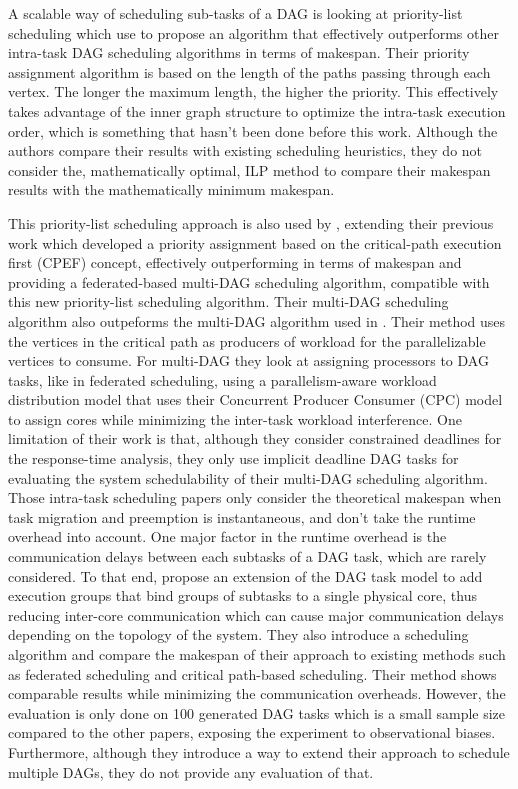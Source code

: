 A scalable way of scheduling sub-tasks of a DAG 
is looking at priority-list scheduling
which \citet{He2019DagIntra} use to propose 
an algorithm that effectively outperforms
other intra-task DAG scheduling algorithms
in terms of makespan.
Their priority assignment algorithm
is based on the length of the paths passing through each vertex.
The longer the maximum length, the higher the priority.
This effectively takes advantage of the inner graph structure
to optimize the intra-task execution order,
which is something that hasn't been done before this work.
Although the authors compare their results with existing
scheduling heuristics, they do not consider 
the, mathematically optimal, ILP method to compare
their makespan results with the mathematically minimum makespan.

This priority-list scheduling approach is also 
used by \citet{Zhao2022DAGsched}, extending their previous work\cite{zhao2020DAGsched}
which developed a priority assignment based on 
the critical-path execution first (CPEF) concept,
effectively outperforming \citet{He2019DagIntra}
in terms of makespan and providing 
a federated-based multi-DAG scheduling algorithm,
compatible with this new priority-list scheduling algorithm.
Their multi-DAG scheduling algorithm also outpeforms 
the multi-DAG algorithm used in \cite{He2019DagIntra}.
Their method uses the vertices in the critical path 
as producers of workload for the parallelizable vertices
to consume.
For multi-DAG they look at assigning processors
to DAG tasks, like in federated scheduling, using 
a parallelism-aware workload distribution model
that uses their Concurrent Producer Consumer (CPC) model
to assign cores while minimizing the inter-task workload interference.
One limitation of their work is that,
although they consider constrained deadlines for the response-time
analysis, they only use implicit deadline DAG tasks 
for evaluating the system schedulability of their multi-DAG 
scheduling algorithm.\\


Those intra-task scheduling papers only consider the theoretical
makespan when task migration and preemption 
is instantaneous, and don't take the runtime overhead into account.
One major factor in the runtime overhead is the communication 
delays between each subtasks of a DAG task, which are rarely considered.
To that end, \citet{Shi2024DagExecGroups}
propose an extension of the DAG task model to add 
execution groups that bind groups of subtasks
to a single physical core, thus reducing 
inter-core communication which can cause major
communication delays depending on the topology of the system.
They also introduce a scheduling algorithm 
and compare the makespan of their approach to existing methods
such as federated scheduling and critical path-based scheduling.
Their method shows comparable results while minimizing 
the communication overheads.
However, the evaluation is only done on 100 generated 
DAG tasks which is a small sample size compared to the other papers\cite{Zhao2022DAGsched}\cite{He2019DagIntra},
exposing the experiment to observational biases.
Furthermore, although they introduce a way to extend their approach to schedule
multiple DAGs, they do not provide any evaluation of that.


